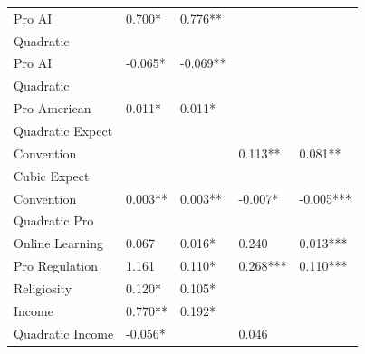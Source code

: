 \documentclass[review]{elsarticle}
\begin{document}
\begin{table}
\begin{tabular}{lllll}
            Pro AI & 0.700* & 0.776** \\ %
            Quadratic
            \\Pro AI & -0.065* & -0.069** \\ %
            Quadratic
            \\Pro American & 0.011* & 0.011* \\ %
            Quadratic Expect
            \\Convention &  &  & 0.113** & 0.081** \\ %
            Cubic Expect
            \\Convention & 0.003** & 0.003** & -0.007* & -0.005*** \\ %
            Quadratic Pro
            \\Online Learning & 0.067 & 0.016* & 0.240 & 0.013*** \\ %
            Pro Regulation & 1.161 & 0.110* & 0.268*** & 0.110*** \\ %
            Religiosity & 0.120* & 0.105* \\ %
            Income & 0.770** & 0.192* \\ %
            Quadratic Income & -0.056* &  & 0.046 &  \\ %

\end{tabular}
\end{table}
\end{document}
